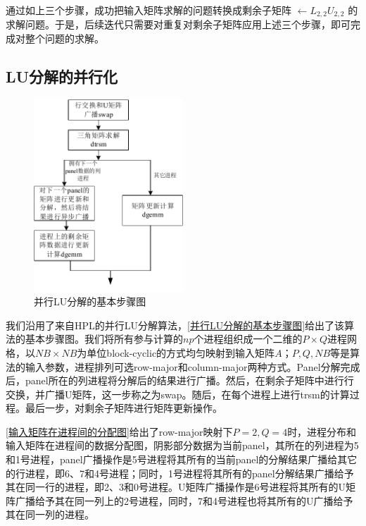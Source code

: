     通过如上三个步骤，成功把输入矩阵求解的问题转换成剩余子矩阵 $\leftarrow L_{2,2}U_{2,2}$ 的求解问题。于是，后续迭代只需要对重复对剩余子矩阵应用上述三个步骤，即可完成对整个问题的求解。

    \subsection{LU分解的并行化}
    \label{LU分解的并行化}

    \begin{figure}
        \centering
        \includegraphics[width=0.5\textwidth]{image/chap02/PLU}
        \caption{并行LU分解的基本步骤图}
        \label{并行LU分解的基本步骤图}
    \end{figure}

    我们沿用了来自HPL的并行LU分解算法，\autoref{并行LU分解的基本步骤图}给出了该算法的基本步骤图。我们将所有参与计算的$\mathit{np}$个进程组织成一个二维的$P\times Q$进程网格，以$\mathit{NB}\times\mathit{NB}$为单位block-cyclic的方式均匀映射到输入矩阵$A$；$P,Q,\mathit{NB}$等是算法的输入参数，进程排列可选row-major和column-major两种方式。Panel分解完成后，panel所在的列进程将分解后的结果进行广播。然后，在剩余子矩阵中进行行交换，并广播U矩阵，这一步称之为swap。随后，在每个进程上进行trsm的计算过程。最后一步，对剩余子矩阵进行矩阵更新操作。

    \autoref{输入矩阵在进程间的分配图}给出了row-major映射下$P=2,Q=4$时，进程分布和输入矩阵在进程间的数据分配图，阴影部分数据为当前panel，其所在的列进程为5和1号进程，panel广播操作是5号进程将其所有的当前panel的分解结果广播给其它的行进程，即6、7和4号进程；同时，1号进程将其所有的panel分解结果广播给予其在同一行的进程，即2、3和0号进程。U矩阵广播操作是6号进程将其所有的U矩阵广播给予其在同一列上的2号进程，同时，7和4号进程也将其所有的U广播给予其在同一列的进程。

